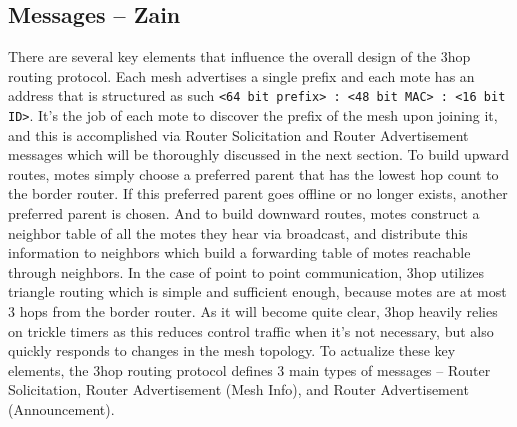 \subsection{Messages -- Zain}
There are several key elements that influence the overall design of the 3hop routing protocol.
Each mesh advertises a single prefix and each mote has an address that is structured as such \texttt{<64 bit prefix> : <48 bit MAC> : <16 bit ID>}.
It's the job of each mote to discover the prefix of the mesh upon joining it, and this is accomplished via Router Solicitation and Router Advertisement messages which will be thoroughly discussed in the next section.
To build upward routes, motes simply choose a preferred parent that has the lowest hop count to the border router.
If this preferred parent goes offline or no longer exists, another preferred parent is chosen.
And to build downward routes, motes construct a neighbor table of all the motes they hear via broadcast, and distribute this information to neighbors which build a forwarding table of motes reachable through neighbors.
In the case of point to point communication, 3hop utilizes triangle routing which is simple and sufficient enough, because motes are at most 3 hops from the border router.
As it will become quite clear, 3hop heavily relies on trickle timers as this reduces control traffic when it's not necessary, but also quickly responds to changes in the mesh topology.
To actualize these key elements, the 3hop routing protocol defines 3 main types of messages -- Router Solicitation, Router Advertisement (Mesh Info), and Router Advertisement (Announcement).

